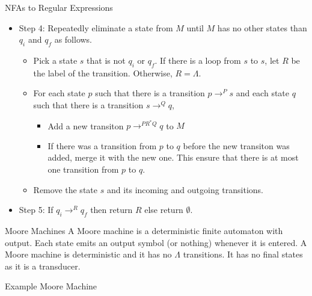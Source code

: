 \documentclass{beamer}
\begin{document}
\begin{frame}[allowframebreaks]{NFAs to Regular Expressions}
\begin{itemize}
                After this step, there is at most one transition from $p$ to $q$ for all states $p$ and $q$. 
   \item Step 4: Repeatedly eliminate a state from $M$ until $M$ has no other states than $q_i$ and $q_f$ as follows.
   			\begin{itemize} 
   			  \item Pick a state $s$ that is not $q_i$ or $q_f$. 
   			  		If there is a loop from $s$ to $s$,
   			  		let $R$ be the label of the transition. Otherwise, $R=\Lambda$. 
   			  \item For each state $p$ such that there is a transition 
   			  		$p\longrightarrow^P s$ and each state $q$ such that there is a transition $s\longrightarrow^ Q q$,
   			  		\begin{itemize} 
   			  		  \item Add a new transiton $p\longrightarrow^{PR^*Q} q$ to $M$
   			  		  \item If there was a transition from $p$ to $q$ before the new transiton was added, 
   			  		  merge it with the new one. This ensure that there is at most one transition from $p$ to $q$. 
					\end{itemize}
   			   \item Remove the state $s$ and its incoming and outgoing transitions.
   			\end{itemize}    
   	\item Step 5: If $q_i\longrightarrow^R q_f$ then return $R$ else return $\emptyset$. 
\end{itemize}

\end{frame}

\begin{frame}{Moore Machines} 
A Moore machine is a deterministic finite automaton with output. 
Each state emits an output symbol (or nothing) whenever it is entered. 
A Moore machine is deterministic and it has no $\Lambda$ transitions. 
It has no final states as it is a transducer. 
\end{frame}

\begin{frame}{Example Moore Machine}
\begin{center}
\end{center}
\end{frame}
\end{document}
